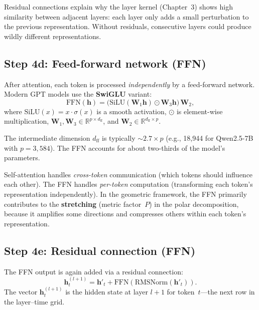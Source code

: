 \documentclass[11pt, twoside, openright]{memoir}
\begin{document}
\begin{keyidea}
Residual connections explain why the layer kernel (Chapter~3) shows high
similarity between adjacent layers: each layer only adds a small perturbation
to the previous representation.  Without residuals, consecutive layers
could produce wildly different representations.
\end{keyidea}

\subsection{Step 4d: Feed-forward network (FFN)}

After attention, each token is processed \emph{independently} by a
feed-forward network.  Modern GPT models use the \textbf{SwiGLU} variant:
\[
  \text{FFN}(\mathbf{h}) =
  \bigl(\text{SiLU}(\mathbf{W}_1 \mathbf{h}) \odot \mathbf{W}_3 \mathbf{h}\bigr)
  \, \mathbf{W}_2,
\]
where $\text{SiLU}(x) = x \cdot \sigma(x)$ is a smooth activation,
$\odot$ is element-wise multiplication,
$\mathbf{W}_1, \mathbf{W}_3 \in \mathbb{R}^{p \times d_{\text{ff}}}$, and
$\mathbf{W}_2 \in \mathbb{R}^{d_{\text{ff}} \times p}$.

The intermediate dimension $d_{\text{ff}}$ is typically $\sim 2.7 \times p$
(e.g., 18{,}944 for Qwen2.5-7B with $p = 3{,}584$).  The FFN accounts for
about two-thirds of the model's parameters.

\begin{keyidea}
Self-attention handles \emph{cross-token} communication (which tokens
should influence each other).  The FFN handles \emph{per-token} computation
(transforming each token's representation independently).  In the geometric
framework, the FFN primarily contributes to the \textbf{stretching}
(metric factor~$P$) in the polar decomposition, because it amplifies some
directions and compresses others within each token's representation.
\end{keyidea}

\subsection{Step 4e: Residual connection (FFN)}

The FFN output is again added via a residual connection:
\[
  \mathbf{h}^{(l+1)}_t = \mathbf{h}'_t + \text{FFN}(\text{RMSNorm}(\mathbf{h}'_t)).
\]
The vector $\mathbf{h}^{(l+1)}_t$ is the hidden state at layer $l+1$ for
token~$t$---the next row in the layer--time grid.
\end{document}
